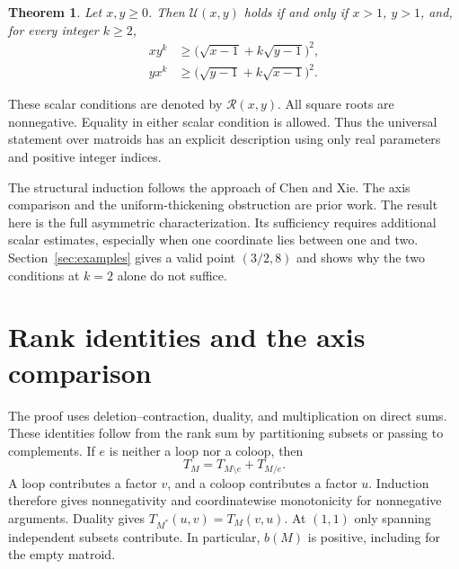 \documentclass[11pt,a4paper]{article}
\newtheorem{theorem}{Theorem}
\newcommand{\U}{\mathcal U}
\newcommand{\Reg}{\mathcal R}
\begin{document}
\begin{theorem}\label{thm:main}
Let $x,y\geq0$. Then $\U(x,y)$ holds if and only if $x>1$, $y>1$, and,
for every integer $k\geq2$,
\begin{align}
xy^k&\geq\bigl(\sqrt{x-1}+k\sqrt{y-1}\bigr)^2,\label{eq:forward}\\
yx^k&\geq\bigl(\sqrt{y-1}+k\sqrt{x-1}\bigr)^2.\label{eq:reverse}
\end{align}
\end{theorem}

These scalar conditions are denoted by $\Reg(x,y)$. All square roots are
nonnegative. Equality in either scalar condition is allowed. Thus the
universal statement over matroids has an explicit description using only
real parameters and positive integer indices.

The structural induction follows the approach of Chen and Xie.
The axis comparison and the uniform-thickening obstruction are prior work.
The result here is the full asymmetric characterization. Its sufficiency
requires additional scalar estimates, especially when one coordinate lies
between one and two. Section~\ref{sec:examples} gives a valid point
$(3/2,8)$ and shows why the two conditions at $k=2$ alone do not suffice.

\section{Rank identities and the axis comparison}

The proof uses deletion--contraction, duality, and multiplication on direct sums.
These identities follow from the rank sum by partitioning subsets or
passing to complements. If $e$ is neither a loop nor a coloop, then
\[
T_M=T_{M\setminus e}+T_{M/e}.
\]
A loop contributes a factor $v$, and a coloop contributes a factor $u$.
Induction therefore gives nonnegativity and coordinatewise monotonicity
for nonnegative arguments. Duality gives $T_{M^*}(u,v)=T_M(v,u)$.
At $(1,1)$ only spanning independent subsets contribute. In particular,
$b(M)$ is positive, including for the empty matroid.
\end{document}
